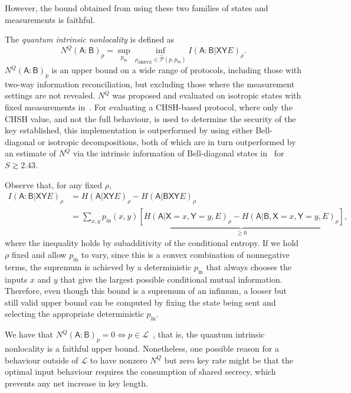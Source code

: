 \documentclass[10pt, a4paper]{article}
\numberwithin{equation}{section} %
\theoremstyle{definition}
\theoremstyle{plain}
\newcommand{\?}{\mathrel{?}} %
\newcommand{\crv}[1]{\mathsf{#1}}
\newcommand{\Ls}{\mathcal{L}}
\newcommand{\compatstates}[3][]{\hat{\mathcal{P}}#1(#2,#3)}
\newcommand{\prin}[1][p]{#1_{\mathrm{in}}}
\begin{document}
    However, the bound obtained from  using these two families of states and measurements is faithful.

    The \emph{quantum intrinsic nonlocality} is defined as~\cite{DIQKD_Limits}
    \begin{equation}
    N^Q{(\crv{A}:\crv{B})}_p = \sup_{\prin} \inf_{\rho_{\crv{ABXY}E}\in\compatstates{p}{\prin}} I{(\crv{A}:\crv{B}|\crv{XY}E)}_{\rho}.
    \end{equation}
    \(N^Q{(\crv{A}:\crv{B})}_p\) is an upper bound on a wide range of protocols, including those with two-way information reconciliation, but excluding those where the measurement settings are not revealed. \(N^Q\) was proposed and evaluated on isotropic states with fixed measurements in~\cite{DIQKD_Limits}. For evaluating a CHSH-based protocol, where only the CHSH value, and not the full behaviour, is used to determine the security of the key established, this implementation is outperformed by  using either Bell-diagonal or isotropic decompositions, both of which are in turn outperformed by an estimate of \(N^Q\) via the intrinsic information of Bell-diagonal states in~\cite[Appendix B]{RevisedPeres} for \(S \gtrsim 2.43\).

    Observe that, for any fixed \(\rho\),
    \begin{align}
      I{(\crv{A}:\crv{B}|\crv{XY}E)}_{\rho} &= H{(\crv{A}|\crv{XY}E)}_{\rho} - H{(\crv{A}|\crv{BXY}E)}_{\rho} \\
                                            &= \sum_{x,y} \prin(x,y) \underbrace{\left[ H{(\crv{A}|\crv{X}=x,\crv{Y}=y,E)}_{\rho} - H{(\crv{A}|\crv{B},\crv{X}=x,\crv{Y}=y,E)}_{\rho} \right]}_{\geq 0},
    \end{align}
    where the inequality holds by subadditivity of the conditional entropy. If we hold \(\rho\) fixed and allow \(\prin\) to vary, since this is a convex combination of nonnegative terms, the supremum is achieved by a deterministic \(\prin\) that always chooses the inputs \(x\) and \(y\) that give the largest possible conditional mutual information. Therefore, even though this bound is a supremum of an infimum, a looser but still valid upper bound can be computed by fixing the state being sent and selecting the appropriate deterministic \(\prin\).

    We have that \(N^Q{(\crv{A}:\crv{B})}_p = 0 \Leftrightarrow p \in \Ls\)~\cite[Thm 20]{DIQKD_Limits}, that is, the quantum intrinsic nonlocality is a faithful upper bound. Nonetheless, one possible reason for a behaviour outside of \(\Ls\) to have nonzero \(N^Q\) but zero key rate might be that the optimal input behaviour requires the consumption of shared secrecy, which prevents any net increase in key length.
\end{document}
